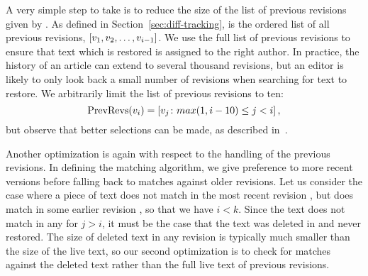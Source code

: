 A very simple step to take is to reduce the size of the list of
previous revisions given by .
As defined in Section~\ref{sec:diff-tracking},  
is the ordered list of all previous revisions,
$\left[ v_{1}, v_{2}, \ldots, v_{i-1} \right]$.
We use the full list of previous revisions to ensure that text which
is restored is assigned to the right author.
In practice, the history of an article can extend to several thousand
revisions, but an editor is likely to only look back a small number
of revisions when searching for text to restore.
We arbitrarily limit the list of previous revisions to ten:
\begin{equation*}
    \mathrm{PrevRevs}(v_{i}) = \left[ v_{j} \colon
	max(1,i-10) \le j < i \right],
\end{equation*}
but observe that better selections can be made, as described
in~\cite{Chatterjee2008}.

Another optimization is again with respect to the handling of the
previous revisions.
In defining the matching algorithm, we give preference to more recent
versions before falling back to matches against older revisions.
Let us consider the case where a piece of text does not match in the
most recent revision ,
but does match in some earlier revision , so that we have $i < k$.
Since the text does not match in any  for $j > i$,
it must be the case that the text was deleted in  and
never restored.
The size of deleted text in any revision is typically much smaller
than the size of the live text, so our second optimization is
to check for matches against the deleted text rather than the full
live text of previous revisions.


